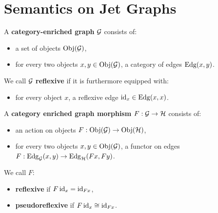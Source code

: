 \documentclass[a4paper]{memoir}
\begin{document}
\section{Semantics on Jet Graphs} \label{sec:poresh-jetgph}
\begin{definition} \label{def:cat-enriched-graph}
	A \textbf{category-enriched graph} ${\mathcal G}$ consists of:
	\begin{itemize}
		\item a set of objects $\mathrm{Obj}({\mathcal G})$,
		\item for every two objects $x, y \in \mathrm{Obj}({\mathcal G})$, a category of edges ${\mathrm{Edg}}(x, y)$.
	\end{itemize}
	We call ${\mathcal G}$ \textbf{reflexive} if it is furthermore equipped with:
	\begin{itemize}
		\item for every object $x$, a reflexive edge $\mathrm{id}_x \in {\mathrm{Edg}}(x, x)$.
	\end{itemize}
	
	\noindent A \textbf{category enriched graph morphism} $F : {\mathcal G} \to {\mathcal H}$ consists of:
	\begin{itemize}
		\item an action on objects $F : \mathrm{Obj}({\mathcal G}) \to \mathrm{Obj}({\mathcal H})$,
		\item for every two objects $x, y \in \mathrm{Obj}({\mathcal G})$, a functor on edges $F : {\mathrm{Edg}}_{\mathcal G}(x, y) \to {\mathrm{Edg}}_{\mathcal H}(Fx, Fy)$.
	\end{itemize}
	We call $F$:
	\begin{itemize}
		\item \textbf{reflexive} if $F\,\mathrm{id}_x = \mathrm{id}_{Fx}$,
		\item \textbf{pseudoreflexive} if $F\,\mathrm{id}_x \cong \mathrm{id}_{Fx}$.
	\end{itemize}
\end{definition}
\end{document}
